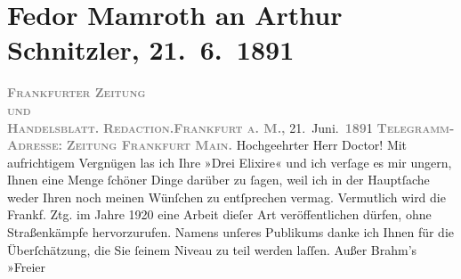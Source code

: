 

               \section[Fedor Mamroth an Arthur Schnitzler, 21. 6. 1891]{ Fedor Mamroth an Arthur Schnitzler, 21. 6. 1891}\nopagebreak{}\rehead{ }\begin{ledgroupsized}[t]{13cm}\normalsize\beginnumbering{} \toendnotes[C]{\smallbreak\pagebreak[2]} 
\toendnotes[C]{\smallbreak}\pstart
           \noindent{}{\pb}\textcolor{gray}{\textbf{\textsc{Frankfurter Zeitung}}}{\\}\textcolor{gray}{\textbf{\textsc{und}}}{\\}\textcolor{gray}{\textbf{\textsc{Handelsblatt.}}}\pend
           \pstart
           \textcolor{gray}{\textbf{\textsc{Redaction.}}}\hfill \textcolor{gray}{\textbf{\textsc{Frankfurt a. M.,}}}{ }21. Juni. \textcolor{gray}{\textbf{\textsc{189}}}1\pend
           \pstart
           \textcolor{gray}{\textbf{\textsc{Telegramm-Adresse:}}}\pend
           \pstart
           \textcolor{gray}{\textbf{\textsc{Zeitung Frankfurt Main.}}}\pend
           \pstart{}Hochgeehrter Herr Doctor!\pend\pstart
           Mit aufrichtigem Vergnügen las ich Ihre »Drei
                  Elixire« und ich verſage es mir ungern, Ihnen eine Menge ſchöner Dinge
               darüber zu ſagen, weil ich in der Hauptſache weder Ihren noch meinen Wünſchen zu
               entſprechen vermag. Vermutlich wird die Frankf.
                  Ztg. im Jahre 1920 eine Arbeit dieſer Art veröffentlichen
               dürfen, ohne Straßenkämpfe hervorzurufen. Namens unſeres Publikums danke ich Ihnen
               für die Überſchätzung, die Sie ſeinem Niveau zu teil werden laſſen. Außer Brahm’s »Freier

\end{ledgroupsized}

